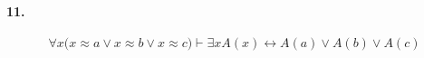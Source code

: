 \documentclass[]{exam}
\begin{document}
\paragraph[11.1]{11.}

$$\forall x \biggl( x \approx a \vee x \approx b \vee x \approx c \biggr)
\vdash \exists x A(x) \longleftrightarrow A(a) \vee A(b) \vee A(c)$$
\end{document}
